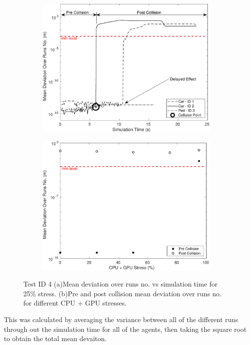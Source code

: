 \begin{figure}[h]
    \centering
    \begin{subfigure}{.49\textwidth}
        \includegraphics[width=1\textwidth]{Other/Figures/CarsPeopleCollsionsCG25.pdf}
        \caption{}
        \label{CarsPeopleCollsionsCG25}
    \end{subfigure}
    \begin{subfigure}{.49\textwidth}
        \includegraphics[width=1\textwidth]{Other/Figures/CarsPeopleCollisionPrePost.pdf}
        \caption{}
        \label{CarsPeopleCollisionPrePost}
    \end{subfigure}
    \caption{Test ID 4 (a)Mean deviation over runs no. vs simulation time for 25\% stress. (b)Pre and post collision mean deviation over runs no. for different CPU + GPU stresses.}
\end{figure}
This was calculated by averaging the variance between all of the different runs through out the simulation time for all of the agents, then taking the square root to obtain the total mean devaiton.


